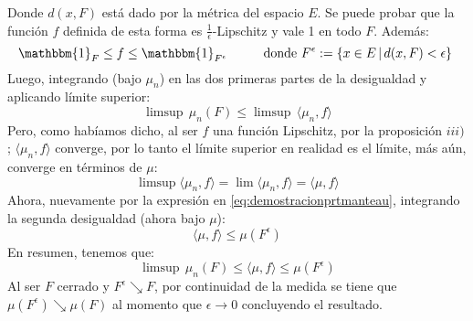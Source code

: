 \documentclass[a4paper]{article}
\numberwithin{equation}{subsection}
\begin{document}
Donde $d(x,F)$ está dado por la métrica del espacio $E$. Se puede probar que la función $f$ definida de esta forma es $\frac{1}{\epsilon}$-Lipschitz y vale 1 en todo $F$. Además:
\begin{equation}
    \mathbbm{1}_F \leq f \leq \mathbbm{1}_{F^{\epsilon}}\hspace{1cm}\text{donde }F^{\epsilon}:=\{x\in E\,|\,d(x,F)<\epsilon\}\
    \label{eq:demostracionprtmanteau}
\end{equation}
Luego, integrando (bajo $\mu_n$) en las dos primeras partes de la desigualdad y aplicando límite superior:
\[\limsup\,\mu_n(F)\leq \limsup\,\langle \mu_n,f\rangle\]
Pero, como habíamos dicho, al ser $f$ una función Lipschitz, por la proposición $iii)$; $\langle \mu_n,f\rangle$ converge, por lo tanto el límite superior en realidad es el límite, más aún, converge en términos de $\mu$:
\begin{equation}
    \limsup \langle \mu_n,f\rangle = \lim \langle\mu_n,f\rangle = \langle \mu,f\rangle
\end{equation}
Ahora, nuevamente por la expresión en \ref{eq:demostracionprtmanteau}, integrando la segunda desigualdad (ahora bajo $\mu$):
\[\langle\mu,f\rangle \leq \mu(F^{\epsilon})\]
En resumen, tenemos que:
\[\limsup\,\mu_n(F) \leq \langle\mu,f\rangle \leq\mu(F^{\epsilon})\]
Al ser $F$ cerrado y $F^{\epsilon} \searrow F$, por continuidad de la medida se tiene que $\mu(F^{\epsilon})\searrow \mu(F)$ al momento que $\epsilon \rightarrow 0$ concluyendo el resultado.
\end{document}
